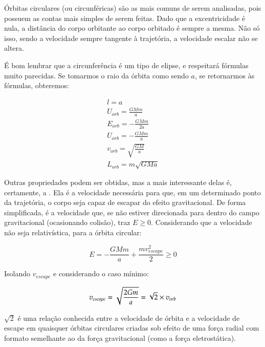 Órbitas circulares (ou circunféricas) são as mais comuns de serem analisadas, pois possuem as contas mais simples de serem feitas. Dado que a excentricidade é nula, a distância do corpo orbitante ao corpo orbitado é sempre a mesma. Não só isso, sendo a velocidade sempre tangente à trajetória, a velocidade escalar não se altera.{\\}

É bom lembrar que a circunferência é um tipo de elipse, e respeitará fórmulas muito parecidas. Se tomarmos o raio da órbita como sendo $a$, se retornarmos às fórmulas, obteremos:

\begin{gather}
	l = a									\label{eq74}		\\
	U_{orb} = \frac{GMm}{a}					\label{eq75}		\\
	E_{orb} = -\frac{GMm}{2a}				\label{eq76}		\\
	U_{orb} = -\frac{GMm}{a}				\label{eq77}		\\
	v_{orb} = \sqrt{\frac{GM}{a}}			\label{eq78}		\\
	L_{orb} = m\sqrt{GMa}					\label{eq79}
\end{gather}

Outras propriedades podem ser obtidas, mas a mais interessante delas é, certamente, a . Ela é a velocidade necessária para que, em um determinado ponto da trajetória, o corpo seja capaz de escapar do efeito gravitacional. De forma simplificada, é a velocidade que, se não estiver direcionada para dentro do campo gravitacional (ocasionando colisão), traz $E \geq 0$. Considerando que a velocidade não seja relativística, para a órbita circular:

\begin{equation}
	E = -\frac{GMm}{a} + \frac{mv_{escape}^2}{2} \geq 0		\label{eq80}
\end{equation}

Isolando $v_{escape}$ e considerando o caso mínimo:

\begin{equation}
	v_{escape} = \sqrt{\frac{2Gm}{a}} = \sqrt{2} \times v_{orb}		
	\label{eq81}
\end{equation}

$\sqrt{2}$ é uma relação conhecida entre a velocidade de órbita e a velocidade de escape em quaisquer órbitas circulares criadas sob efeito de uma força radial com formato semelhante ao da força gravitacional (como a força eletrostática).{\\}

